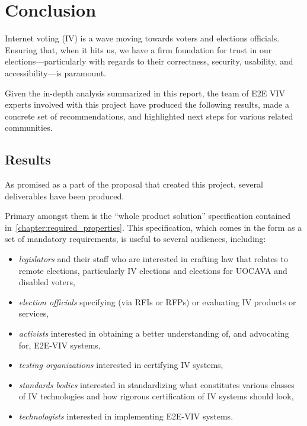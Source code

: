 \chapter{Conclusion}
\label{chapter:conclusion}

Internet voting (IV) is a wave moving towards voters and elections
officials.  Ensuring that, when it hits us, we have a firm foundation
for trust in our elections---particularly with regards to their
correctness, security, usability, and accessibility---is paramount.

Given the in-depth analysis summarized in this report, the team of E2E
VIV experts involved with this project have produced the following
results, made a concrete set of recommendations, and highlighted next
steps for various related communities.

\section{Results}

As promised as a part of the proposal that created this project,
several deliverables have been produced.  

Primary amongst them is the ``whole product solution'' specification
contained in~\autoref{chapter:required_properties}. This
specification, which comes in the form as a set of mandatory
requirements, is useful to several audiences, including:
\begin{itemize}
\item \emph{legislators} and their staff who are interested in
  crafting law that relates to remote elections, particularly IV
  elections and elections for UOCAVA and disabled voters,
\item \emph{election officials} specifying (via RFIs or RFPs) or
  evaluating IV products or services,
\item \emph{activists} interested in obtaining a better understanding
  of, and advocating for, E2E-VIV systems,
\item \emph{testing organizations} interested in certifying IV
  systems,
\item \emph{standards bodies} interested in standardizing what
  constitutes various classes of IV technologies and how rigorous
  certification of IV systems should look,
\item \emph{technologists} interested in implementing E2E-VIV systems.
\end{itemize}

